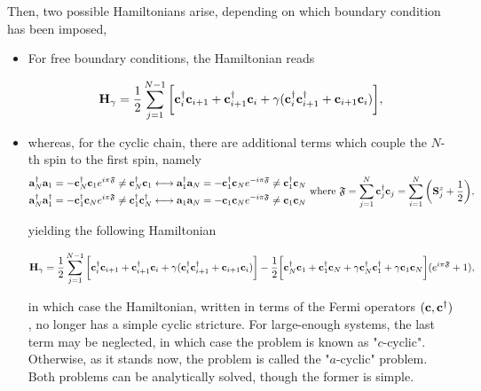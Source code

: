 \documentclass{homework}
\begin{document}
Then, two possible Hamiltonians arise, depending on which boundary condition has been imposed,

\begin{itemize}
    \item For free boundary conditions, the Hamiltonian reads 
    
    \begin{equation}
        {\bf H}_{\gamma} = \frac{1}{2} \sum_{j = 1}^{N-1} \bigg[ {\bf c}_i^\dagger {\bf c}_{i+1} + {\bf c}_{i+1}^\dagger {\bf c}_{i} + \gamma ( {\bf c}_i^\dagger {\bf c}_{i+1}^\dagger +  {\bf c}_{i+1} {\bf c}_{i})\bigg],
    \end{equation}
    
    \item whereas, for the cyclic chain, there are additional terms which couple the $N$-th spin to the first spin, namely 
    \begin{equation}
    \begin{split}
        {\bf a}_N^\dagger {\bf a}_1 = - {\bf c}_N^\dagger {\bf c}_1 e^{i \pi \mathfrak{F}} \neq {\bf c}_N^\dagger {\bf c}_1 \longleftrightarrow {\bf a}_1^\dagger {\bf a}_N = - {\bf c}_1^\dagger {\bf c}_N e^{-i \pi \mathfrak{F}} \neq {\bf c}_1^\dagger {\bf c}_N \\
        {\bf a}_N^\dagger {\bf a}_1^\dagger = - {\bf c}_1^\dagger {\bf c}_N e^{i \pi \mathfrak{F}} \neq {\bf c}_1^\dagger {\bf c}_N^\dagger \longleftrightarrow {\bf a}_1 {\bf a}_N= - {\bf c}_1 {\bf c}_N e^{-i \pi \mathfrak{F}} \neq {\bf c}_1 {\bf c}_N
    \end{split} \textnormal{ where } \mathfrak{F} = \sum_{j=1}^{N} {\bf c}_j^\dagger {\bf c}_j = \sum_{i=1}^{N} \bigg({\bf S}_j^z + \frac{1}{2}\bigg),
    \end{equation}
    
    yielding the following Hamiltonian 
    
    \begin{equation}
        {\bf H}_{\gamma} = \frac{1}{2} \sum_{j = 1}^{N-1} \bigg[ {\bf c}_i^\dagger {\bf c}_{i+1} + {\bf c}_{i+1}^\dagger {\bf c}_{i} + \gamma ( {\bf c}_i^\dagger {\bf c}_{i+1}^\dagger +  {\bf c}_{i+1} {\bf c}_{i})\bigg] - \frac{1}{2} \bigg[{\bf c}_N^\dagger {\bf c}_1 + {\bf c}_1^\dagger {\bf c}_N + \gamma {\bf c}_N^\dagger {\bf c}_1^\dagger + \gamma {\bf c}_1 {\bf c}_N\bigg] (e^{i\pi \mathfrak{F}} + 1),
    \end{equation}
    
    in which case the Hamiltonian, written in terms of the Fermi operators $({\bf c}, {\bf c}^\dagger)$, no longer has a simple cyclic stricture. For large-enough systems, the last term may be neglected, in which case the problem is known as "$c$-cyclic". Otherwise, as it stands now, the problem is called the "$a$-cyclic" problem. Both problems can be analytically solved, though the former is simple. \\
\end{itemize}
\end{document}
